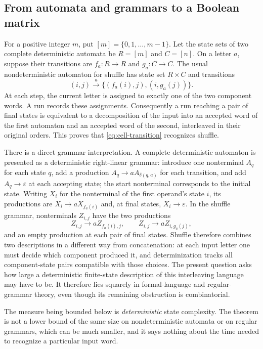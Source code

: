 \documentclass[11pt,letterpaper]{article}
\numberwithin{equation}{section}
\theoremstyle{definition}
\theoremstyle{remark}
\begin{document}
\subsection{From automata and grammars to a Boolean matrix}
For a positive integer $m$, put $[m]=\{0,1,\ldots,m-1\}$. Let the state sets
of two complete deterministic automata be $R=[m]$ and $C=[n]$. On a letter
$a$, suppose their transitions are $f_a:R\to R$ and $g_a:C\to C$.
The usual nondeterministic automaton for shuffle has state set $R\times C$
and transitions
\begin{equation}\label{eq:cell-transition}
 (i,j)\xrightarrow{a}\{(f_a(i),j),(i,g_a(j))\}.
\end{equation}
At each step, the current letter is assigned to exactly one of the two
component words. A run records these assignments. Consequently a run
reaching a pair of final states is equivalent to a decomposition of the
input into an accepted word of the first automaton and an accepted word of
the second, interleaved in their original orders. This proves that
\eqref{eq:cell-transition} recognizes shuffle.

There is a direct grammar interpretation. A complete deterministic automaton
is presented as a deterministic right-linear grammar: introduce one
nonterminal $A_q$ for each state $q$, add a production
$A_q\to aA_{\delta(q,a)}$ for each transition, and add $A_q\to\varepsilon$ at
each accepting state; the start nonterminal corresponds to the initial state.
Writing $X_i$ for the nonterminal of the first operand's state $i$, its
productions are $X_i\to aX_{f_a(i)}$ and, at final states, $X_i\to\varepsilon$.
In the shuffle grammar, nonterminals $Z_{i,j}$ have the two productions
\[
 Z_{i,j}\to aZ_{f_a(i),j},\qquad
 Z_{i,j}\to aZ_{i,g_a(j)},
\]
and an empty production at each pair of final states. Shuffle therefore
combines two descriptions in a different way from concatenation: at each
input letter one must decide which component produced it, and determinization
tracks all component-state pairs compatible with those choices. The present
question asks how large a deterministic finite-state description of this
interleaving language may have to be. It therefore lies squarely in
formal-language and regular-grammar theory, even though its remaining
obstruction is combinatorial.

The measure being bounded below is \emph{deterministic} state complexity. The
theorem is not a lower bound of the same size on nondeterministic automata or
on regular grammars, which can be much smaller, and it says nothing about the
time needed to recognize a particular input word.
\end{document}
